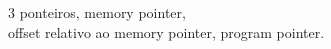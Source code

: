 \documentclass[preview]{standalone}
\begin{document}
3 ponteiros, memory pointer, \\offset relativo ao memory pointer, program pointer.\\
\end{document}
